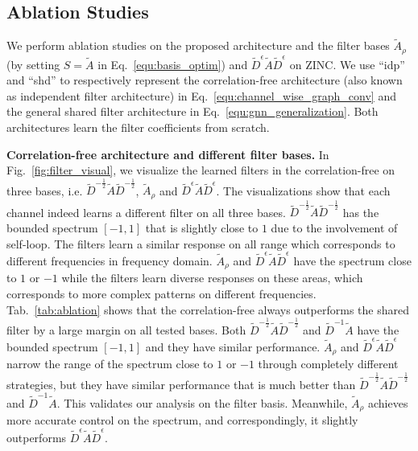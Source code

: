 \documentclass[nohyperref]{article}
\theoremstyle{plain}
\theoremstyle{definition}
\theoremstyle{remark}
\begin{document}
\subsection{Ablation Studies}
\label{sec:ablation_studies}

We perform ablation studies on the proposed architecture and the filter bases $\tilde A_{\rho}$ (by setting $S=\tilde A$ in Eq.~\ref{equ:basis_optim}) and $\tilde{D}^{\epsilon}\tilde{A}\tilde{D}^{\epsilon}$ on ZINC.
We use ``idp'' and ``shd'' to respectively represent the correlation-free architecture (also known as independent filter architecture) in Eq.~\ref{equ:channel_wise_graph_conv} and the general shared filter architecture in Eq.~\ref{equ:gnn_generalization}.
Both architectures learn the filter coefficients from scratch.

\textbf{Correlation-free architecture and different filter bases.}
In Fig.~\ref{fig:filter_visual}, we visualize the learned filters in the correlation-free on three bases, i.e. $\tilde{D}^{-\frac{1}{2}}\tilde{A}\tilde{D}^{-\frac{1}{2}}$, $\tilde A_{\rho}$ and $\tilde{D}^{\epsilon}\tilde{A}\tilde{D}^{\epsilon}$.
The visualizations show that each channel indeed learns a different filter on all three bases.
$\tilde{D}^{-\frac{1}{2}}\tilde{A}\tilde{D}^{-\frac{1}{2}}$ has the bounded spectrum $[-1, 1]$ that is slightly close to $1$ due to the involvement of self-loop.
The filters learn a similar response on all range which corresponds to different frequencies in frequency domain.
$\tilde A_{\rho}$ and $\tilde{D}^{\epsilon}\tilde{A}\tilde{D}^{\epsilon}$ have the spectrum close to $1$ or $-1$ while the filters learn diverse responses on these areas, which corresponds to more complex patterns on different frequencies.
Tab.~\ref{tab:ablation} shows that the correlation-free always outperforms the shared filter by a large margin on all tested bases.
Both $\tilde{D}^{-\frac{1}{2}}\tilde{A}\tilde{D}^{-\frac{1}{2}}$ and $\tilde D^{-1}\tilde A$ have the bounded spectrum $[-1, 1]$ and they have similar performance.
$\tilde A_{\rho}$ and $\tilde{D}^{\epsilon}\tilde{A}\tilde{D}^{\epsilon}$ narrow the range of the spectrum close to $1$ or $-1$ through completely different strategies, but they have similar performance that is much better than $\tilde{D}^{-\frac{1}{2}}\tilde{A}\tilde{D}^{-\frac{1}{2}}$ and $\tilde D^{-1}\tilde A$.
This validates our analysis on the filter basis.
Meanwhile, $\tilde A_{\rho}$ achieves more accurate control on the spectrum, and correspondingly, it slightly outperforms $\tilde{D}^{\epsilon}\tilde{A}\tilde{D}^{\epsilon}$.
\end{document}
